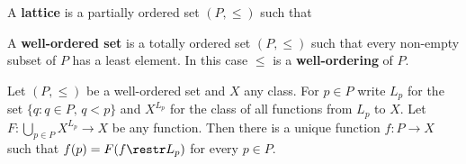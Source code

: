       
 A {\bf lattice} is a partially ordered set 
$(P,\le)$ such that 
      
      
 A {\bf well-ordered set} is a totally ordered 
set $(P,\le)$ such that every non-empty subset of 
$P$ has a least element.   In this case 
$\le$ is a {\bf well-ordering} of $P$. 
      
  Let $(P,\le)$ be a 
well-ordered set and $X$ any class.   For $p\in P$ write $L_p$ for the 
set $\{q:q\in P,\,q<p\}$ and $X^{L_p}$ for the class of all functions 
from $L_p$ to 
$X$.   Let $F:\bigcup_{p\in P}X^{L_p}\to X$ be any function.   Then 
there is a unique function $f:P\to X$ such that $f(p)=F(f\restr L_p)$ 
for every $p\in P$. 
      
